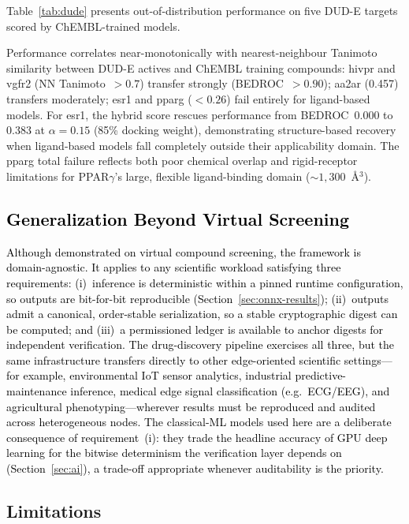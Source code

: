 \documentclass[conference]{IEEEtran}
\begin{document}
Table~\ref{tab:dude} presents out-of-distribution
performance on five DUD-E targets scored by
ChEMBL-trained models.

Performance correlates near-monotonically with
nearest-neighbour Tanimoto similarity between DUD-E
actives and ChEMBL training compounds: hivpr and vgfr2
(NN Tanimoto~$>0.7$) transfer strongly
(BEDROC~$>0.90$); aa2ar (0.457) transfers moderately;
esr1 and pparg ($<0.26$) fail entirely for ligand-based
models.
For esr1, the hybrid score rescues performance from
BEDROC~$0.000$ to $0.383$ at $\alpha{=}0.15$ (85\%
docking weight), demonstrating structure-based recovery
when ligand-based models fall completely outside their
applicability domain.
The pparg total failure reflects both poor chemical
overlap and rigid-receptor limitations for PPAR$\gamma$'s
large, flexible ligand-binding domain
(${\sim}1{,}300$~\AA$^3$).

\textcolor{black}{\subsection{\textbf{ Generalization Beyond Virtual Screening}}
\label{sec:generalization}
Although demonstrated on virtual compound screening, the
framework is domain-agnostic. It applies to any scientific
workload satisfying three requirements: (i)~inference is
deterministic within a pinned runtime configuration, so
outputs are bit-for-bit reproducible (Section~\ref{sec:onnx-results});
(ii)~outputs admit a canonical, order-stable serialization,
so a stable cryptographic digest can be computed; and
(iii)~a permissioned ledger is available to anchor digests
for independent verification. The drug-discovery pipeline
exercises all three, but the same infrastructure transfers
directly to other edge-oriented scientific settings---for
example, environmental IoT sensor analytics, industrial
predictive-maintenance inference, medical edge signal
classification (e.g.\ ECG/EEG), and agricultural
phenotyping---wherever results must be reproduced and
audited across heterogeneous nodes. The classical-ML models
used here are a deliberate consequence of requirement~(i):
they trade the headline accuracy of GPU deep learning for
the bitwise determinism the verification layer depends on
(Section~\ref{sec:ai}), a trade-off appropriate whenever
auditability is the priority.}


\subsection{\textbf{Limitations}}
\label{sec:discussion}
\end{document}
